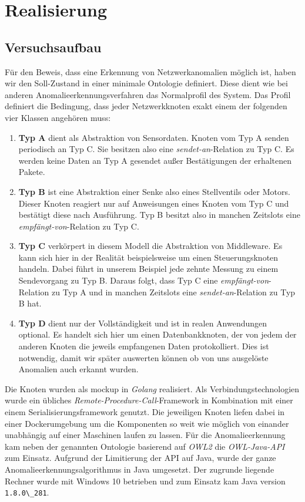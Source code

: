 \chapter{Realisierung}
\section{Versuchsaufbau}
Für den Beweis, dass eine Erkennung von Netzwerkanomalien möglich ist, haben wir den Soll-Zustand in einer minimale Ontologie definiert. Diese dient wie bei anderen Anomalieerkennungsverfahren das Normalprofil des System\cite{ye2001anomaly}. Das Profil definiert die Bedingung, dass jeder Netzwerkknoten exakt einem der folgenden vier Klassen angehören muss:
\begin{enumerate}
\item\textbf{Typ A} dient als Abstraktion von Sensordaten. Knoten vom Typ A senden periodisch an Typ C. Sie besitzen also eine \textit{sendet-an}-Relation zu Typ C. Es werden keine Daten an Typ A gesendet außer Bestätigungen der erhaltenen Pakete.
\item\textbf{Typ B} ist eine Abstraktion einer Senke also eines Stellventils oder Motors. Dieser Knoten reagiert nur auf Anweisungen eines Knoten vom Typ C und bestätigt diese nach Ausführung. Typ B besitzt also in manchen Zeitslots eine \textit{empfängt-von}-Relation zu Typ C.
\item\textbf{Typ C} verkörpert in diesem Modell die Abstraktion von Middleware. Es kann sich hier in der Realität beispielsweise um einen Steuerungsknoten handeln. Dabei führt in unserem Beispiel jede zehnte Messung zu einem Sendevorgang zu Typ B. Daraus folgt, dass Typ C eine \textit{empfängt-von}-Relation zu Typ A und in manchen Zeitslots eine \textit{sendet-an}-Relation zu Typ B hat.
\item\textbf{Typ D} dient nur der Vollständigkeit und ist in realen Anwendungen optional. Es handelt sich hier um einen Datenbankknoten, der von jedem der anderen Knoten die jeweils empfangenen Daten protokolliert. Dies ist notwendig, damit wir später auswerten können ob von uns ausgelöste Anomalien auch erkannt wurden.
\end{enumerate}
Die Knoten wurden als \Gls{mockup} in \textit{Golang}\cite{golang} realisiert. Als Verbindungstechnologien wurde ein übliches \textit{Remote-Procedure-Call}-Framework\cite{grpc} in Kombination mit einer einem Serialisierungsframework\cite{protobuf} genutzt. Die jeweiligen Knoten liefen dabei in einer Dockerumgebung\cite{docker} um die Komponenten so weit wie möglich von einander unabhängig auf einer Maschinen laufen zu lassen. Für die Anomalieerkennung kam neben der genannten Ontologie basierend auf \textit{OWL2}\cite{owl2} die \textit{OWL-Java-API}\cite{owlapi} zum Einsatz. Aufgrund der Limitierung der API auf Java, wurde der ganze Anomalieerkennungsalgorithmus in Java umgesetzt. Der zugrunde liegende Rechner wurde mit Windows 10 betrieben und zum Einsatz kam Java version \verb|1.8.0\_281|.\\
